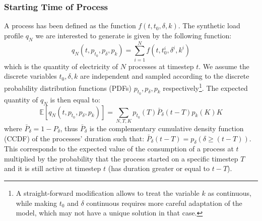 \documentclass[conference]{IEEEtran}
\begin{document}
\subsubsection{Starting Time of Process}
A process has been defined as the function $f(t, t_0, \delta, k)$. The synthetic load profile $q_N$ we are interested to generate is given by the following function:
\begin{equation}\label{eq:GenerateSynthetic}
q_N(t, p_{t_0}, p_{\delta}, p_k) = \sum_{i=1}^N f(t, t_0^i, \delta^i, k^i)
\end{equation}
which is the quantity of electricity of $N$ processes at timestep $t$. We assume the discrete variables $t_0, \delta, k$ are independent and sampled according to the discrete probability distribution functions (PDFs) $p_{t_0}, p_{\delta}, p_k$ respectively\footnote{A straight-forward modification allows to treat the variable $k$ as continuous, while making $t_0$ and $\delta$ continuous requires more careful adaptation of the model, which may not have a unique solution in that case.}. The expected quantity of $q_N$ is then equal to:
\begin{equation}\label{eq:expectedQuantity}
\mathbb{E}\left[ q_N(t, p_{t_0}, p_{\delta}, p_k) \right] = \sum_{N, T, K} p_{t_0}(T) \bar{P}_{\delta} (t-T) p_k(K) K
\end{equation}
where $\bar{P}_{\delta} = 1 - P_{\delta}$, thus $\bar{P}_{\delta}$ is the complementary cumulative density function (CCDF) of the processes' duration such that: $\bar{P}_{\delta}(t-T) = p_{\delta}(\delta \geq (t-T))$. This corresponds to the expected value of the consumption of a process at $t$ multiplied by the probability that the process started on a specific timestep $T$ and it is still active at timestep $t$ (has duration greater or equal to $t-T$).

\end{document}
